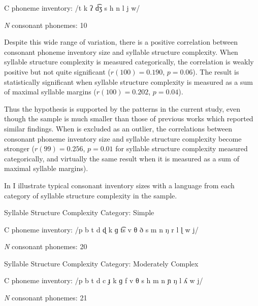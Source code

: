\ea\label{ex:4.21}
\begin{Coding}
\item[C phoneme inventory:] /t k ʔ d͡ʒ s h n l j w/

\item[\textit{N} consonant phonemes:] 10
\end{Coding}
\z

  Despite this wide range of variation, there is a positive correlation between consonant phoneme inventory size and syllable structure complexity. When syllable structure complexity is measured categorically, the correlation is weakly positive but not quite significant ($r(100) = 0.190$, $p = 0.06$). The result is statistically significant when syllable structure complexity is measured as a sum of maximal syllable margins ($r(100) = 0.202$, $p = 0.04$).

  Thus the hypothesis is supported by the patterns in the current study, even though the sample is much smaller than those of previous works which reported similar findings. When  is excluded as an outlier, the correlations between consonant phoneme inventory size and syllable structure complexity become stronger ($r(99) = 0.256$, $p = 0.01$ for syllable structure complexity measured categorically, and virtually the same result when it is measured as a sum of maximal syllable margins).

  In  I illustrate typical consonant inventory sizes with a language from each category of syllable structure complexity in the sample.

\ea\label{ex:4.22}
\begin{Coding}
\item[Syllable Structure Complexity Category:] Simple

\item[C phoneme inventory:] /p b t d ɖ k ɡ t͡s v θ ð s m n ŋ r l ɭ w j/

\item[\textit{N} consonant phonemes:] 20
\end{Coding}
\z

\ea\label{ex:4.23}
\begin{Coding}
\item[Syllable Structure Complexity Category:] Moderately Complex

\item[C phoneme inventory:] /p b t d c ɟ k ɡ f v θ s h m n ɲ ŋ l ʎ w j/

\item[\textit{N} consonant phonemes:] 21
\end{Coding}
\z

